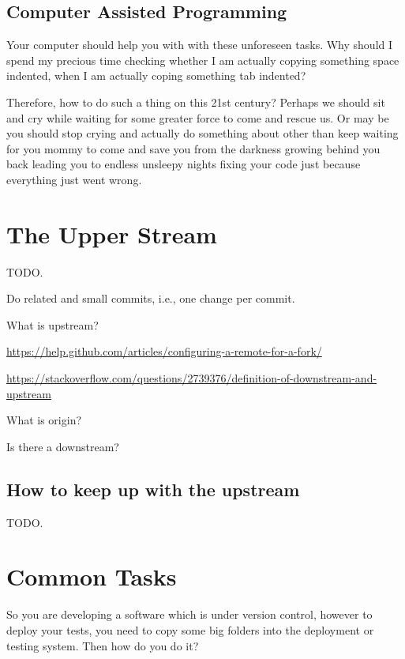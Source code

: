 \begin{englishtext}
    \subsection{Computer Assisted Programming}

    Your computer should help you with with these unforeseen tasks. Why should I
    spend my precious time checking whether I am actually copying something
    space indented, when I am actually coping something tab indented?

    Therefore, how to do such a thing on this 21\q{}st century? Perhaps we
    should sit and cry while waiting for some greater force to come and rescue
    us. Or may be you should stop crying and actually do something about other
    than keep waiting for you mommy to come and save you from the darkness
    growing behind you back leading you to endless unsleepy nights fixing your
    code just because everything just went wrong.



    \section{The Upper Stream}

    TODO.

    Do related and small commits, i.e., one change per commit.

    What is upstream?

    \url{https://help.github.com/articles/configuring-a-remote-for-a-fork/}

    \url{https://stackoverflow.com/questions/2739376/definition-of-downstream-and-upstream}

    What is origin?

    Is there a downstream?



    \subsection{How to keep up with the upstream}

    TODO.



    \section{Common Tasks}

    So you are developing a software which is under version control, however to
    deploy your tests, you need to copy some big folders into the deployment or
    testing system. Then how do you do it?


\end{englishtext}
